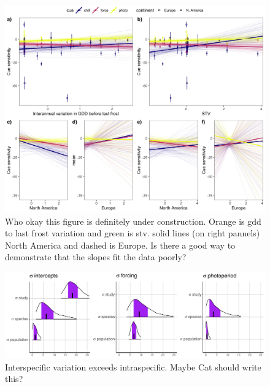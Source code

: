 \documentclass[12pt]{article}\usepackage[]{graphicx}\usepackage[]{color}
\begin{document}
\begin{figure}[h!]
    \centering
 \includegraphics[width=\textwidth]{..//..//analyses/ranges/figures/mock1.jpeg} 
    \caption{Who okay this figure is definitely under construction. Orange is gdd to last frost variation and green is stv. solid lines (on right pannels) North America and dashed is Europe. Is there a good way to demonstrate that the slopes fit the data poorly? }
    \label{fig:mods}
\end{figure}


\begin{figure}[h!]
    \centering
 \includegraphics[width=\textwidth]{..//..//analyses/ranges/figures/variancepartitioning.pdf} 
    \caption{Interspecific variation exceeds intraspecific.  Maybe Cat should write this?}
    \label{fig:popy}
\end{figure}
\end{document}
